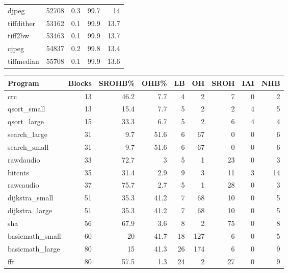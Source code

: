 \begin{tabular}{lrrrr}
 djpeg           &   52708 &    0.3 &         99.7 &    14   \\
 tiffdither      &   53162 &    0.1 &         99.9 &    13.7 \\
 tiff2bw         &   53463 &    0.1 &         99.9 &    13.7 \\
 cjpeg           &   54837 &    0.2 &         99.8 &    13.4 \\
 tiffmedian      &   55708 &    0.1 &         99.9 &    13.6 \\
\hline
\end{tabular}\begin{tabular}{lrrrrrrrr}
\hline
 Program         &   Blocks &   SROHB\% &   OHB\% &   LB &   OH &   SROH &   IAI &   NHB \\
\hline
 crc             &       13 &     46.2 &    7.7 &    4 &    2 &      7 &     0 &     2 \\
 qsort\_small     &       13 &     15.4 &    7.7 &    5 &    2 &      2 &     4 &     5 \\
 qsort\_large     &       15 &     33.3 &    6.7 &    5 &    2 &      6 &     4 &     4 \\
 search\_large    &       31 &      9.7 &   51.6 &    6 &   67 &      0 &     0 &     6 \\
 search\_small    &       31 &      9.7 &   51.6 &    6 &   67 &      0 &     0 &     6 \\
 rawdaudio       &       33 &     72.7 &    3   &    5 &    1 &     23 &     0 &     3 \\
 bitcnts         &       35 &     31.4 &    2.9 &    9 &    3 &     11 &     3 &    14 \\
 rawcaudio       &       37 &     75.7 &    2.7 &    5 &    1 &     28 &     0 &     3 \\
 dijkstra\_small  &       51 &     35.3 &   41.2 &    7 &   68 &     10 &     0 &     5 \\
 dijkstra\_large  &       51 &     35.3 &   41.2 &    7 &   68 &     10 &     0 &     5 \\
 sha             &       56 &     67.9 &    3.6 &    8 &    2 &     75 &     0 &     8 \\
 basicmath\_small &       60 &     20   &   41.7 &   18 &  127 &      6 &     0 &     5 \\
 basicmath\_large &       80 &     15   &   41.3 &   26 &  174 &      6 &     0 &     9 \\
 fft             &       80 &     57.5 &    1.3 &   24 &    2 &     27 &     0 &     9 \\

\end{tabular}
